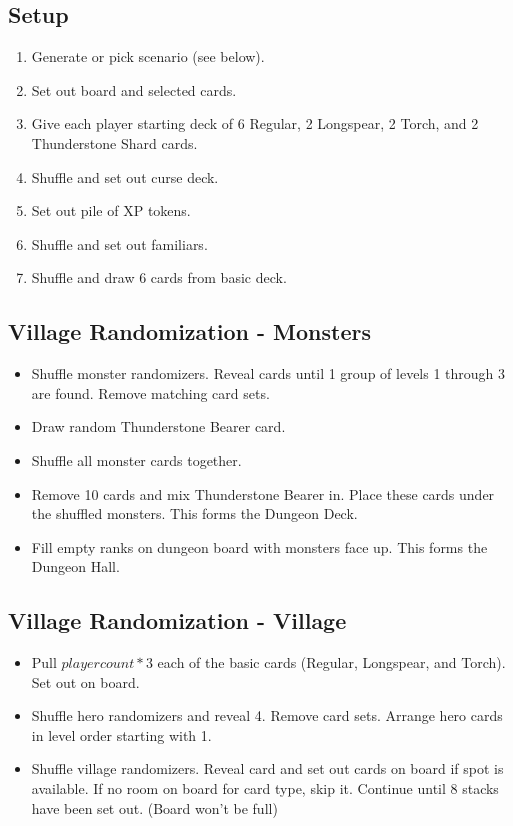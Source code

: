 \documentclass[12pt]{article}
\newenvironment{enumerateCustom}
{\begin{enumerate}
  \setlength{\itemsep}{1pt}
  \setlength{\parskip}{0pt}
  \setlength{\parsep}{0pt}}
{\end{enumerate}}
\newenvironment{itemizeCustom}
{\begin{itemize}
  \setlength{\itemsep}{1pt}
  \setlength{\parskip}{0pt}
  \setlength{\parsep}{0pt}}
{\end{itemize}}
\begin{document}
\begin{mdframed}[style = customFrame]
\begin{multicols*}{2}

\section*{Setup}
\begin{enumerateCustom}
	\item Generate or pick scenario (see below). 
	\item Set out board and selected cards.
	\item Give each player starting deck of 6 Regular, 2 Longspear, 2 Torch, and 2 Thunderstone Shard cards.
	\item Shuffle and set out curse deck.
	\item Set out pile of XP tokens.
	\item Shuffle and set out familiars.
	\item Shuffle and draw 6 cards from basic deck.
\end{enumerateCustom}

\subsection*{Village Randomization - Monsters}
\begin{itemizeCustom}
	\item Shuffle monster randomizers. Reveal cards until 1 group of levels 1 through 3 are found. Remove matching card sets.
	\item Draw random Thunderstone Bearer card.
	\item Shuffle all monster cards together.
	\item Remove 10 cards and mix Thunderstone Bearer in. Place these cards under the shuffled monsters. This forms the Dungeon Deck.
	\item Fill empty ranks on dungeon board with monsters face up. This forms the Dungeon Hall.
\end{itemizeCustom}

\subsection*{Village Randomization - Village}
\begin{itemizeCustom}
	\item Pull $player count * 3$ each of the basic cards (Regular, Longspear, and Torch). Set out on board.
	\item Shuffle hero randomizers and reveal 4. Remove card sets. Arrange hero cards in level order starting with 1.
	\item Shuffle village randomizers. Reveal card and set out cards on board if spot is available. If no room on board for card type, skip it. Continue until 8 stacks have been set out. (Board won't be full)
\end{itemizeCustom}


\end{multicols*}
\end{mdframed}
\end{document}
